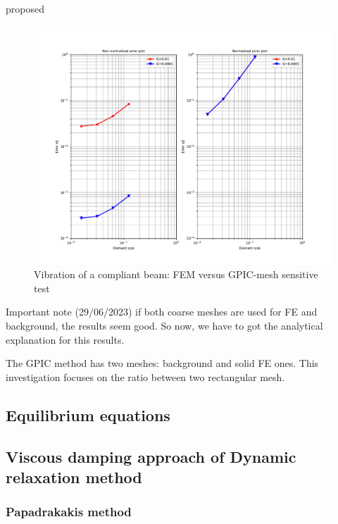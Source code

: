 \documentclass[preprint,3p,12pt]{elsarticle}
\begin{document}
\cite{Murakami2001} proposed

\begin{figure}[h!]
	\centering 
	\includegraphics[width=1.0\textwidth]{MMS2D_Error.pdf}
	\caption{Vibration of a compliant beam: FEM versus GPIC-mesh sensitive test}
	\label{Fig1}
\end{figure}

Important note (29/06/2023) if both coarse meshes are used for FE and background, the results seem good. So now, we have to got the analytical explanation for this results. 

The GPIC method has two meshes: background and solid FE ones. This investigation focuses on the ratio between two rectangular mesh.


\subsection{Equilibrium equations}\label{subsec:2:1}

\subsection{Viscous damping approach of Dynamic relaxation method} \label{subsec:2:2}
\subsubsection{Papadrakakis method}
\end{document}
